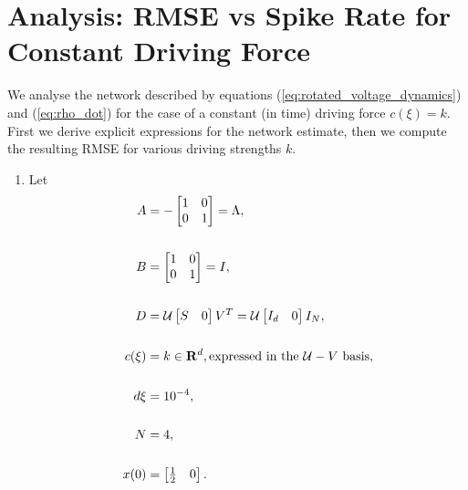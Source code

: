 \section{Analysis: RMSE vs Spike Rate for Constant Driving Force}




We analyse the network described by equations (\ref{eq:rotated_voltage_dynamics}) and (\ref{eq:rho_dot}) for the case of a constant (in time) driving force $c(\xi) = k$. First we derive explicit expressions for the network estimate, then we compute the resulting RMSE for various driving strengths $k$.\\
\begin{enumerate}
\item Let 
\begin{align*}
A &= -\begin{bmatrix}  
1 & 0 \\
0 & 1
\end{bmatrix} = \Lambda,\notag \\
\notag \\
B &= \begin{bmatrix}  
1 & 0 \\
0 & 1
\end{bmatrix} = I, \notag \\
\notag \\
D
&=
\mathcal{U} 
\begin{bmatrix}
S & 0
\end{bmatrix}
V^T
=
\mathcal{U} 
\begin{bmatrix}
I_d & 0
\end{bmatrix}
I_N \notag,
\\
\\
c(\xi) &= k \in \mathbf{R}^d, \text{expressed in the $\mathcal{U}-V$ basis},\\
\notag \\
d\xi &= 10^{-4},\notag \\
\notag \\
N &= 4,\notag \\
\notag \\
x(0) &= \begin{bmatrix} \frac{1}{2} & 0 \end{bmatrix}.\notag 
\end{align*}


\end{enumerate}

